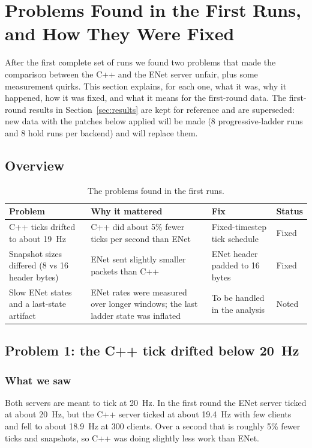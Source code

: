 \section{Problems Found in the First Runs, and How They Were Fixed}\label{sec:fixes}

After the first complete set of runs we found two problems that made the comparison between the C++ and the ENet server unfair, plus some measurement quirks. This section explains, for each one, what it was, why it happened, how it was fixed, and what it means for the first-round data. The first-round results in Section~\ref{sec:results} are kept for reference and are superseded: new data with the patches below applied will be made (8 progressive-ladder runs and 8 hold runs per backend) and will replace them.

\subsection{Overview}
\begin{table}[H]
\centering
\small
\begin{tabular}{p{}p{}p{}p{}}
\toprule
Problem & Why it mattered & Fix & Status \\
\midrule
C++ ticks drifted to about 19~Hz & C++ did about 5\% fewer ticks per second than ENet & Fixed-timestep tick schedule & Fixed \\
Snapshot sizes differed (8 vs 16 header bytes) & ENet sent slightly smaller packets than C++ & ENet header padded to 16 bytes & Fixed \\
Slow ENet states and a last-state artifact & ENet rates were measured over longer windows; the last ladder state was inflated & To be handled in the analysis & Noted \\
\bottomrule
\end{tabular}
\caption{The problems found in the first runs.}
\end{table}

\subsection{Problem 1: the C++ tick drifted below 20~Hz}

\subsubsection{What we saw}
Both servers are meant to tick at 20~Hz. In the first round the ENet server ticked at about 20~Hz, but the C++ server ticked at about 19.4~Hz with few clients and fell to about 18.9~Hz at 300 clients. Over a second that is roughly 5\% fewer ticks and snapshots, so C++ was doing slightly less work than ENet.

